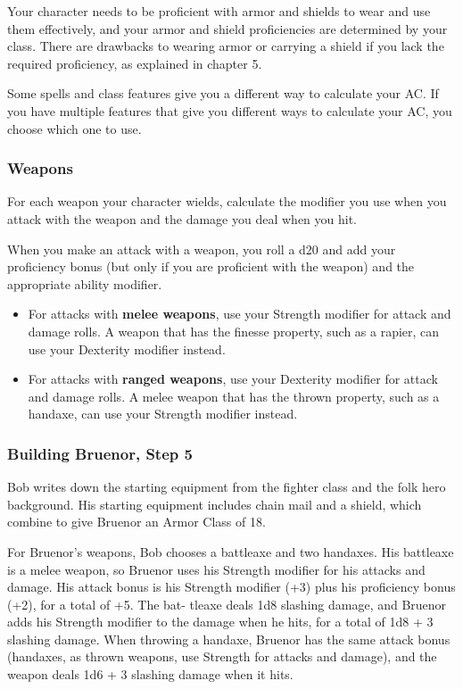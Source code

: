 Your character needs to be proficient with armor and shields to wear and use them effectively, and your armor and shield proficiencies are determined by your class. There are drawbacks to wearing armor or carrying a shield if you lack the required proficiency, as explained in chapter 5.

Some spells and class features give you a different way to calculate your AC. If you have multiple features that give you different ways to calculate your AC, you choose which one to use.

\subsubsection{Weapons}
For each weapon your character wields, calculate the modifier you use when you attack with the weapon and the damage you deal when you hit.

When you make an attack with a weapon, you roll a d20 and add your proficiency bonus (but only if you are proficient with the weapon) and the appropriate ability modifier.

\begin{itemize}
  \item For attacks with \textbf{melee weapons}, use your Strength modifier for attack and damage rolls. A weapon that has the finesse property, such as a rapier, can use your Dexterity modifier instead.
  \item For attacks with \textbf{ranged weapons}, use your Dexterity modifier for attack and damage rolls. A melee weapon that has the thrown property, such as a handaxe, can use your Strength modifier instead.
\end{itemize}

\subsubsection{Building Bruenor, Step 5}
Bob writes down the starting equipment from the fighter class and the folk hero background. His starting equipment includes chain mail and a shield, which combine to give Bruenor an Armor Class of 18.

For Bruenor’s weapons, Bob chooses a battleaxe and two handaxes. His battleaxe is a melee weapon, so Bruenor uses his Strength modifier for his attacks and damage. His attack bonus is his Strength modifier (+3) plus his proficiency bonus (+2), for a total of +5. The bat- tleaxe deals 1d8 slashing damage, and Bruenor adds his Strength modifier to the damage when he hits, for a total of 1d8 + 3 slashing damage. When throwing a handaxe, Bruenor has the same attack bonus (handaxes, as thrown weapons, use Strength for attacks and damage), and the weapon deals 1d6 + 3 slashing damage when it hits.

